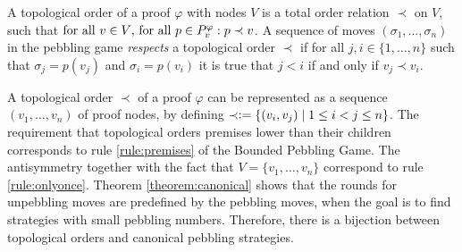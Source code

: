 \begin{definition}
\label{def:topological-order}
A topological order of a proof $\varphi$ with nodes $V$ is a total order relation $\prec$ on $V$, such that 
$\text{for all } v \in V \text{, for all } p \in P_{v}^{\varphi}:
p \prec v$.
A sequence of moves $(\sigma_1,\ldots,\sigma_n)$ in the pebbling game \emph{respects} a topological order $\prec$ if for all $j,i \in \{1,\ldots,n\}$ such that $\sigma_j = p(v_j)$ and $\sigma_i = p(v_i)$ it is true that $j < i$ if and only if $v_j \prec v_i$.
\end{definition}

A topological order $\prec$ of a proof $\varphi$ can be represented as a sequence $(v_1,\dots,v_n)$ of proof nodes, by defining $\prec \mathrel{\mathop:}= \{(v_i,v_j) \mid 1 \leq i < j \leq n\}$. 
The requirement that topological orders premises lower than their children corresponds to rule \ref{rule:premises} of the Bounded Pebbling Game.
The antisymmetry together with the fact that $V = \{v_1,\dots,v_n\}$ correspond to rule \ref{rule:onlyonce}.
Theorem \ref{theorem:canonical} shows that the rounds for unpebbling moves are predefined by the pebbling moves, when the goal is to find strategies with small pebbling numbers.
Therefore, there is a bijection between topological orders and canonical pebbling strategies.


